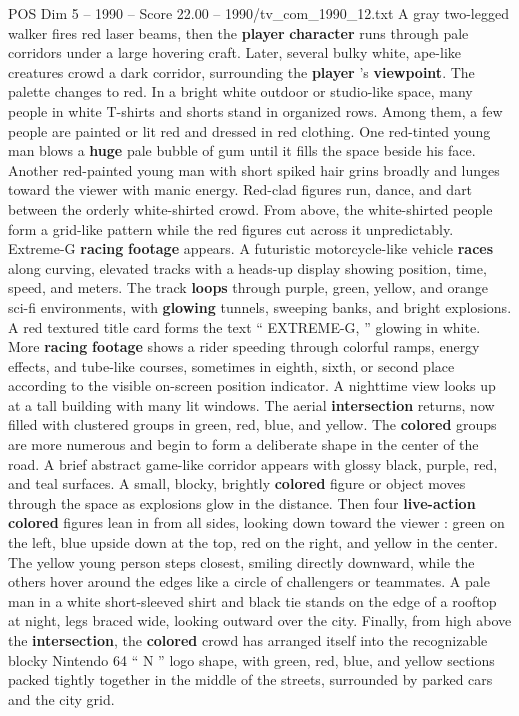 \begin{textsample}{POS Dim 5 – 1990 – Score 22.00 – 1990/tv\_com\_1990\_12.txt}
A gray two-legged walker fires red laser beams, then the \textbf{player} \textbf{character} runs through pale corridors under a large hovering craft.
Later, several bulky white, ape-like creatures crowd a dark corridor, surrounding the \textbf{player} ’s \textbf{viewpoint}.
The palette changes to red.
In a bright white outdoor or studio-like space, many people in white T-shirts and shorts stand in organized rows.
Among them, a few people are painted or lit red and dressed in red clothing.
One red-tinted young man blows a \textbf{huge} pale bubble of gum until it fills the space beside his face.
Another red-painted young man with short spiked hair grins broadly and lunges toward the viewer with manic energy.
Red-clad figures run, dance, and dart between the orderly white-shirted crowd.
From above, the white-shirted people form a grid-like pattern while the red figures cut across it unpredictably.
Extreme-G \textbf{racing} \textbf{footage} appears.
A futuristic motorcycle-like vehicle \textbf{races} along curving, elevated tracks with a heads-up display showing position, time, speed, and meters.
The track \textbf{loops} through purple, green, yellow, and orange sci-fi environments, with \textbf{glowing} tunnels, sweeping banks, and bright explosions.
A red textured title card forms the text “ EXTREME-G, ” glowing in white.
More \textbf{racing} \textbf{footage} shows a rider speeding through colorful ramps, energy effects, and tube-like courses, sometimes in eighth, sixth, or second place according to the visible on-screen position indicator.
A nighttime view looks up at a tall building with many lit windows.
The aerial \textbf{intersection} returns, now filled with clustered groups in green, red, blue, and yellow.
The \textbf{colored} groups are more numerous and begin to form a deliberate shape in the center of the road.
A brief abstract game-like corridor appears with glossy black, purple, red, and teal surfaces.
A small, blocky, brightly \textbf{colored} figure or object moves through the space as explosions glow in the distance.
Then four \textbf{live-action} \textbf{colored} figures lean in from all sides, looking down toward the viewer : green on the left, blue upside down at the top, red on the right, and yellow in the center.
The yellow young person steps closest, smiling directly downward, while the others hover around the edges like a circle of challengers or teammates.
A pale man in a white short-sleeved shirt and black tie stands on the edge of a rooftop at night, legs braced wide, looking outward over the city.
Finally, from high above the \textbf{intersection}, the \textbf{colored} crowd has arranged itself into the recognizable blocky Nintendo 64 “ N ” logo shape, with green, red, blue, and yellow sections packed tightly together in the middle of the streets, surrounded by parked cars and the city grid.

\end{textsample}
